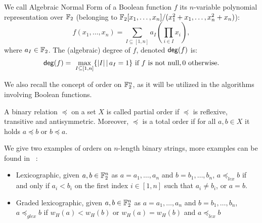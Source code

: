 \documentclass[11pt]{llncs}
\begin{document}
\begin{definition}\label{def:anf}
We call Algebraic Normal Form of a Boolean function $f$ its $n$-variable polynomial representation over $\mathbb{F}_2$ (\ie belonging to $\mathbb{F}_2[x_1,\dots,x_n]/(x_1^2+x_1,\dots,x_n^2+x_n)$):
	\[f(x_1,\dots,x_n)= \sum_{I \subseteq [1,n]} a_I \left( \prod_{i \in I} x_i \right), \]%
	where $a_I\in \mathbb{F}_2$. 
The (algebraic) degree of $f$, denoted $\mathsf{deg}(f)$ is: \[\mathsf{deg}(f)=\
\max_{I\subseteq [1,n]}\{ |I|\, | \, a_I=1\}  \text{ if $f$ is not null},0  \text{ otherwise}.\]
\end{definition}	

We also recall the concept of order on $\mathbb{F}_2^n$, as it will be utilized in the algorithms involving Boolean functions.



\begin{definition}[Order]\label{def:order}
	A binary relation $\preceq$	on a set $X$ is called partial order if $\preceq$ is reflexive, transitive and antisymmetric. 
	Moreover, $\preceq$ is a total order if for all $a,b\in X$ it holds $a\preceq b$ or $b \preceq a$.
	
\end{definition}

We give two examples of orders on $n$-length binary strings, more examples can be found in \eg~\cite{FUN:SteWil12}:
\begin{itemize}
	\item Lexicographic, given $a,b \in \mathbb{F}_2^n$ as $a=a_1,\ldots, a_n$ and $b=b_1,\ldots,b_n$, $a\preceq_{lex} b$ if and only if  $a_i<b_i$ on the first index $i\in [1,n]$ such that $a_i\ne b_i$, or $a=b$.
	\item Graded lexicographic, given $a,b \in \mathbb{F}_2^n$ as $a=a_1,\ldots, a_n$ and $b=b_1,\ldots,b_n$, $a\preceq_{glex} b$ if $w_H(a) < w_H(b)$ or $w_H(a) = w_H(b)$ and $ a\preceq_{lex}  b$
\end{itemize}
\end{document}
